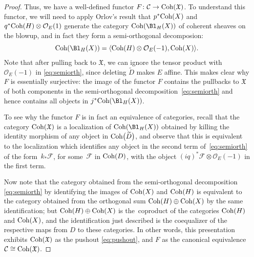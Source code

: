 \documentclass[pdftex]{sigma}%
\numberwithin{equation}{section}
\def\cC{\mathcal{C}}
\def\cO{\mathcal{O}}
\def\cF{\mathcal{F}}
\newcommand\frX{\mathfrak{X}}
\newcommand{\Coh}{\textup{Coh}}
\begin{document}
\begin{proof}
Thus, we have a well-defined functor $F\colon\cC\to \Coh(\frX)$.
To understand this functor,
we will need to apply
Orlov's result \cite{Orl92} that $p^*\Coh(X)$ and $q^*\Coh(H)\otimes\cO_E(1)$ generate the category $\Coh(\Bl_H(X))$ of coherent sheaves on the blowup, and in fact they form a semi-orthogonal decomposion:
\begin{equation}\label{eq:semiorth}
\Coh(\Bl_H(X)) = \langle \Coh(H)\otimes \cO_E(-1), \Coh(X)\rangle.
\end{equation}
Note that after pulling back to $\frX$, we can ignore the tensor
product with $\cO_E(-1)$ in \eqref{eq:semiorth}, since deleting $\widetilde{D}$ makes $E$ affine. This makes clear why $F$ is essentially surjective: the image of the functor $F$ contains the pullbacks to $\frX$ of both components in the semi-orthogonal decomposition~\eqref{eq:semiorth} and hence contains all objects in $j^*\Coh(\Bl_H(X))$.

To see why the functor $F$ is in fact an equivalence of categories, recall that the
category $\Coh(\frX)$ is a localization of $\Coh(\Bl_H(X))$ obtained by killing the identity morphism of any object in $\Coh\big(\widetilde{D}\big)$, and observe that this is equivalent to the localization which identifies any object in the second term of~\eqref{eq:semiorth} of the form~$k_*\cF$, for some~$\cF$ in $\Coh(D)$, with the object $(iq)^*\cF\otimes \cO_E(-1)$ in the first term.

Now note that the
category obtained from the semi-orthogonal decomposition \eqref{eq:semiorth} by identifying the images of $\Coh(X)$ and $\Coh(H)$ is equivalent to the category obtained from the ortho\-go\-nal sum $\Coh(H)\oplus \Coh(X)$ by the same identification;
but $\Coh(H)\oplus \Coh(X)$ is the~co\-pro\-duct of the categories $\Coh(H)$ and $\Coh(X)$, and the identification just described is the coequalizer of the respective maps from $D$ to these categories. In other words, this presentation exhibits $\Coh(\frX)$ as the pushout \eqref{eq:pushout}, and $F$ as the canonical equivalence $\cC\cong \Coh(\frX)$.
\end{proof}
\end{document}
